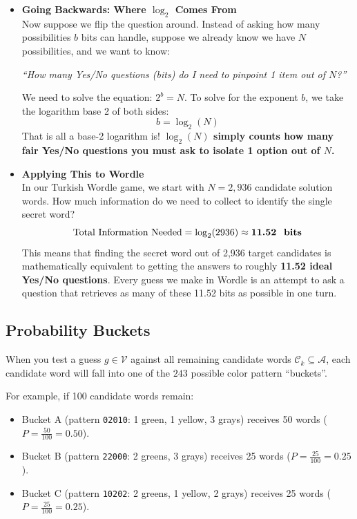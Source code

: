 \documentclass[11pt,a4paper]{article}
\begin{document}
\begin{itemize}[leftmargin=1.5em, itemsep=12pt]
    \item \textbf{Going Backwards: Where $\log_2$ Comes From} \\
    Now suppose we flip the question around. Instead of asking how many possibilities $b$ bits can handle, suppose we already know we have $N$ possibilities, and we want to know:
    \begin{center}
    \textit{``How many Yes/No questions (bits) do I need to pinpoint 1 item out of $N$?''}
    \end{center}
    We need to solve the equation: $2^b = N$. To solve for the exponent $b$, we take the logarithm base 2 of both sides:
    \begin{equation}
    b = \log_2(N)
    \end{equation}
    That is all a base-2 logarithm is! \textbf{$\log_2(N)$ simply counts how many fair Yes/No questions you must ask to isolate 1 option out of $N$.}

    \item \textbf{Applying This to Wordle} \\
    In our Turkish Wordle game, we start with $N = 2,936$ candidate solution words. How much information do we need to collect to identify the single secret word?
    \begin{equation}
    \text{Total Information Needed} = \log_2(2936) \approx \textbf{11.52 \text{ bits}}
    \end{equation}
    This means that finding the secret word out of 2,936 target candidates is mathematically equivalent to getting the answers to roughly \textbf{11.52 ideal Yes/No questions}. Every guess we make in Wordle is an attempt to ask a question that retrieves as many of these 11.52 bits as possible in one turn.
\end{itemize}

\subsection{Probability Buckets}
When you test a guess $g \in \mathcal{V}$ against all remaining candidate words $\mathcal{C}_k \subseteq \mathcal{A}$, each candidate word will fall into one of the $243$ possible color pattern ``buckets''.

For example, if 100 candidate words remain:
\begin{itemize}[itemsep=2pt]
    \item Bucket A (pattern \texttt{02010}: 1 green, 1 yellow, 3 grays) receives 50 words ($P = \frac{50}{100} = 0.50$).
    \item Bucket B (pattern \texttt{22000}: 2 greens, 3 grays) receives 25 words ($P = \frac{25}{100} = 0.25$).
    \item Bucket C (pattern \texttt{10202}: 2 greens, 1 yellow, 2 grays) receives 25 words ($P = \frac{25}{100} = 0.25$).
\end{itemize}
\end{document}
